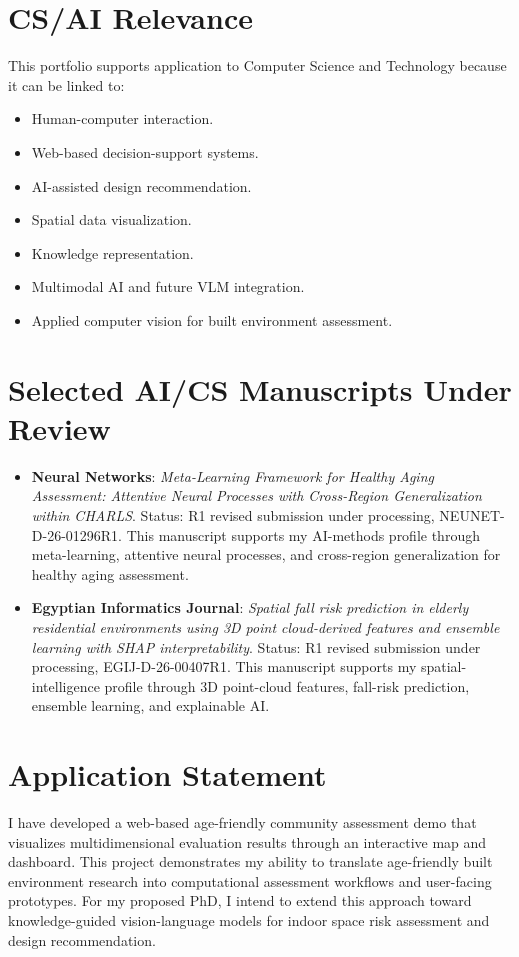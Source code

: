 \documentclass[11pt,a4paper]{article}
\begin{document}
\section*{CS/AI Relevance}
This portfolio supports application to Computer Science and Technology because it can be linked to:

\begin{itemize}
  \item Human-computer interaction.
  \item Web-based decision-support systems.
  \item AI-assisted design recommendation.
  \item Spatial data visualization.
  \item Knowledge representation.
  \item Multimodal AI and future VLM integration.
  \item Applied computer vision for built environment assessment.
\end{itemize}

\section*{Selected AI/CS Manuscripts Under Review}
\begin{itemize}
  \item \textbf{Neural Networks}: \textit{Meta-Learning Framework for Healthy Aging Assessment: Attentive Neural Processes with Cross-Region Generalization within CHARLS}. Status: R1 revised submission under processing, NEUNET-D-26-01296R1. This manuscript supports my AI-methods profile through meta-learning, attentive neural processes, and cross-region generalization for healthy aging assessment.
  \item \textbf{Egyptian Informatics Journal}: \textit{Spatial fall risk prediction in elderly residential environments using 3D point cloud-derived features and ensemble learning with SHAP interpretability}. Status: R1 revised submission under processing, EGIJ-D-26-00407R1. This manuscript supports my spatial-intelligence profile through 3D point-cloud features, fall-risk prediction, ensemble learning, and explainable AI.
\end{itemize}

\section*{Application Statement}
I have developed a web-based age-friendly community assessment demo that visualizes multidimensional evaluation results through an interactive map and dashboard. This project demonstrates my ability to translate age-friendly built environment research into computational assessment workflows and user-facing prototypes. For my proposed PhD, I intend to extend this approach toward knowledge-guided vision-language models for indoor space risk assessment and design recommendation.
\end{document}
